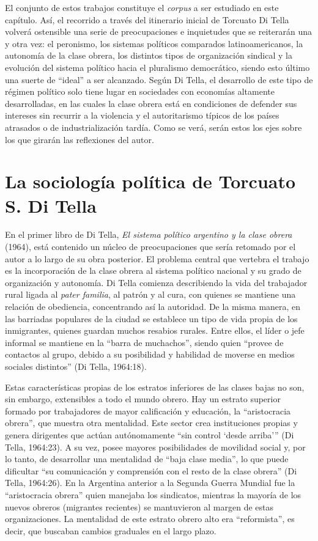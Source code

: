 El conjunto de estos trabajos constituye el \emph{corpus} a ser estudiado en este capítulo. Así, el recorrido a través del itinerario inicial de Torcuato Di Tella volverá ostensible una serie de preocupaciones e inquietudes que se reiterarán una y otra vez: el peronismo, los sistemas políticos comparados latinoamericanos, la autonomía de la clase obrera, los distintos tipos de organización sindical y la evolución del sistema político hacia el pluralismo democrático, siendo esto último una suerte de \enquote{ideal} a ser alcanzado. Según Di Tella, el desarrollo de este tipo de régimen político solo tiene lugar en sociedades con economías altamente desarrolladas, en las cuales la clase obrera está en condiciones de defender sus intereses sin recurrir a la violencia y el autoritarismo típicos de los países atrasados o de industrialización tardía. Como se verá, serán estos los ejes sobre los que girarán las reflexiones del autor.

\section{La sociología política de Torcuato S. Di Tella}

En el primer libro de Di Tella, \emph{El sistema político argentino y la clase obrera} (1964), está contenido un núcleo de preocupaciones que sería retomado por el autor a lo largo de su obra posterior. El problema central que vertebra el trabajo es la incorporación de la clase obrera al sistema político nacional y su grado de organización y autonomía. Di Tella comienza describiendo la vida del trabajador rural ligada al \emph{pater familia}, al patrón y al cura, con quienes se mantiene una relación de obediencia, concentrando así la autoridad. De la misma manera, en las barriadas populares de la ciudad se establece un tipo de vida propia de los inmigrantes, quienes guardan muchos resabios rurales. Entre ellos, el líder o jefe informal se mantiene en la \enquote{barra de muchachos}, siendo quien \enquote{provee de contactos al grupo, debido a su posibilidad y habilidad de moverse en medios sociales distintos} (Di Tella, 1964:18).

Estas características propias de los estratos inferiores de las clases bajas no son, sin embargo, extensibles a todo el mundo obrero. Hay un estrato superior formado por trabajadores de mayor calificación y educación, la \enquote{aristocracia obrera}, que muestra otra mentalidad. Este sector crea instituciones propias y genera dirigentes que actúan autónomamente \enquote{sin control \enquote{desde arriba}} (Di Tella, 1964:23). A su vez, posee mayores posibilidades de movilidad social y, por lo tanto, de desarrollar una mentalidad de \enquote{baja clase media}, lo que puede dificultar \enquote{su comunicación y comprensión con el resto de la clase obrera} (Di Tella, 1964:26). En la Argentina anterior a la Segunda Guerra Mundial fue la \enquote{aristocracia obrera} quien manejaba los sindicatos, mientras la mayoría de los nuevos obreros (migrantes recientes) se mantuvieron al margen de estas organizaciones. La mentalidad de este estrato obrero alto era \enquote{reformista}, es decir, que buscaban cambios graduales en el largo plazo.

